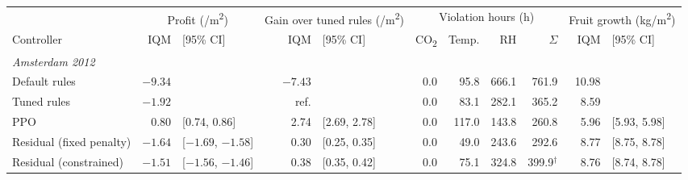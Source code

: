 \documentclass[letterpaper]{article} %
\newcommand{\cotwo}{CO\textsubscript{2}}
\newcommand{\eurm}{\texteuro/m\textsuperscript{2}}
\newcommand{\kgm}{kg/m\textsuperscript{2}}
\begin{document}
\begin{table}[t]
\centering
\small
\setlength{\tabcolsep}{3.5pt}
\begin{tabular}{lr@{\ }lr@{\ }lrrrrr@{\ }l}
\toprule
 & \multicolumn{2}{c}{Profit (\eurm{})} & \multicolumn{2}{c}{Gain over tuned rules (\eurm{})} & \multicolumn{4}{c}{Violation hours (h)} & \multicolumn{2}{c}{Fruit growth (\kgm{})} \\
\cmidrule(lr){2-3}\cmidrule(lr){4-5}\cmidrule(lr){6-9}\cmidrule(lr){10-11}
Controller & IQM & [95\% CI] & IQM & [95\% CI] & \cotwo{} & Temp. & RH & $\Sigma$ & IQM & [95\% CI] \\
\midrule
\multicolumn{11}{l}{\emph{Amsterdam 2012}} \\
Default rules & $-9.34$ &  & $-7.43$ &  & 0.0 & 95.8 & 666.1 & 761.9 & 10.98 &  \\
Tuned rules & $-1.92$ &  & ref. &  & 0.0 & 83.1 & 282.1 & 365.2 & 8.59 &  \\
PPO & 0.80 & [0.74, 0.86] & 2.74 & [2.69, 2.78] & 0.0 & 117.0 & 143.8 & 260.8 & 5.96 & [5.93, 5.98] \\
Residual (fixed penalty) & $-1.64$ & [$-1.69$, $-1.58$] & 0.30 & [0.25, 0.35] & 0.0 & 49.0 & 243.6 & 292.6 & 8.77 & [8.75, 8.78] \\
Residual (constrained) & $-1.51$ & [$-1.56$, $-1.46$] & 0.38 & [0.35, 0.42] & 0.0 & 75.1 & 324.8 & 399.9$^\dagger$ & 8.76 & [8.74, 8.78] \\

\end{tabular}
\end{table}
\end{document}
